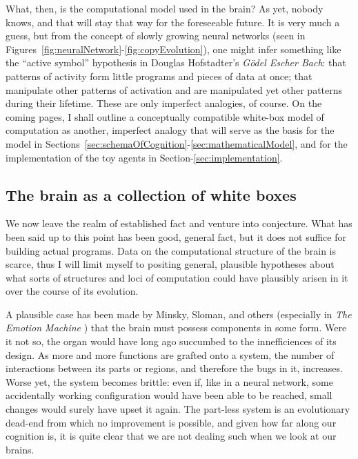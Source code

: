 What, then, is the computational model used in the brain? As yet, nobody knows, and that will stay that way for the foreseeable future. It is very much a guess, but from the concept of slowly growing neural networks (seen in Figures~\ref{fig:neuralNetwork}-\ref{fig:copyEvolution}), one might infer something like the ``active symbol'' hypothesis in Douglas Hofstadter's {\em G\"{o}del Escher Bach}: that patterns of activity form little programs and pieces of data at once; that manipulate other patterns of activation and are manipulated yet other patterns during their lifetime. These are only imperfect analogies, of course. On the coming pages, I shall outline a conceptually compatible white-box model of computation as another, imperfect analogy that will serve as the basis for the model in Sections~\ref{sec:schemaOfCognition}-\ref{sec:mathematicalModel}, and for the implementation of the toy agents in Section-\ref{sec:implementation}.

\subsection{The brain as a collection of white boxes}

We now leave the realm of established fact and venture into conjecture. What has been said up to this point has been good, general fact, but it does not suffice for building actual programs. Data on the computational structure of the brain is scarce, thus I will limit myself to positing general, plausible hypotheses about what sorts of structures and loci of computation could have plausibly arisen in it over the course of its evolution. 

A plausible case has been made by Minsky, Sloman, and others (especially in {\em The Emotion Machine} \cite{emotionMachine}) that the brain must possess components in some form. Were it not so, the organ would have long ago succumbed to the innefficiences of its design. As more and more functions are grafted onto a system, the number of interactions between its parts or regions, and therefore the bugs in it, increases. Worse yet, the system becomes brittle: even if, like in a neural network, some accidentally working configuration would have been able to be reached, small changes would surely have upset it again. The part-less system is an evolutionary dead-end from which no improvement is possible, and given how far along our cognition is, it is quite clear that we are not dealing such when we look at our brains.

